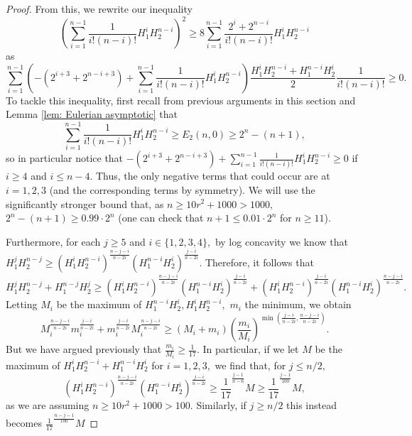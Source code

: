 \documentclass{article}
\theoremstyle{definition}
\theoremstyle{remark}
\begin{document}
\begin{proof}
\par From this, we rewrite our inequality \[\left(\sum\limits_{i=1}^{n-1} \frac{1}{i!(n-i)!}H_1^iH_2^{n-i}\right)^2 \geq 8 \sum\limits_{i=1}^{n-1} \frac{2^i + 2^{n-i}}{i!(n-i)!}H_1^iH_2^{n-i}\] as \[\sum\limits_{i=1}^{n-1} \left(- (2^{i+3} + 2^{n-i+3}) + \sum\limits_{i=1}^{n-1} \frac{1}{i!(n-i)!}H_1^iH_2^{n-i}\right) \frac{H_1^iH_2^{n-i} + H_1^{n-i}H_2^i}{2} \frac{1}{i!(n-i)!} \geq 0.\] To tackle this inequality, first recall from previous arguments in this section and Lemma \ref{lem: Eulerian asymptotic} that \[\sum\limits_{i=1}^{n-1} \frac{1}{i!(n-i)!}H_1^iH_2^{n-i} \geq E_2(n, 0) \geq 2^n - (n+1),\] so in particular notice that $- (2^{i+3} + 2^{n-i+3}) + \sum\limits_{i=1}^{n-1} \frac{1}{i!(n-i)!}H_1^iH_2^{n-i} \geq 0$ if $i \geq 4$ and $i \leq n-4.$ Thus, the only negative terms that could occur are at $i = 1, 2, 3$ (and the corresponding terms by symmetry). We will use the significantly stronger bound that, as $n \geq 10r^2 + 1000 > 1000,$ $2^n - (n+1) \geq 0.99 \cdot 2^n$ (one can check that $n+1 \leq 0.01 \cdot 2^n$ for $n \geq 11$).
\par Furthermore, for each $j \geq 5$ and $i \in \{1, 2, 3, 4\},$ by log concavity we know that $H_1^jH_2^{n-j} \geq (H_1^iH_2^{n-i})^{\frac{n - j - i}{n-2i}} (H_1^{n-i} H_2^i)^{\frac{j - i}{n-2i}}.$ Therefore, it follows that \[H_1^jH_2^{n-j} + H_1^{n-j}H_2^j \geq (H_1^iH_2^{n-i})^{\frac{n - j - i}{n-2i}} (H_1^{n-i} H_2^i)^{\frac{j - i}{n-2i}} + (H_1^iH_2^{n-i})^{\frac{j - i}{n-2i}} (H_1^{n-i} H_2^i)^{\frac{n - j - i}{n-2i}}.\] Letting $M_i$ be the maximum of $H_1^{n-i} H_2^i, H_1^i H_2^{n-i},$ $m_i$ the minimum, we obtain \[M_i^{\frac{n - j - i}{n-2i}} m_i^{\frac{j - i}{n-2i}} + m_i^{\frac{j - i}{n-2i}} M_i^{\frac{n - j - i}{n-2i}} \geq (M_i + m_i) \left(\frac{m_i}{M_i}\right)^{\min(\frac{j-i}{n-2i}, \frac{n-j-i}{n-2i})}.\] But we have argued previously that $\frac{m_i}{M_i} \geq \frac{1}{17}.$ In particular, if we let $M$ be the maximum of $H_1^iH_2^{n-i} + H_1^{n-i}H_2^i$ for $i = 1, 2, 3,$ we find that, for $j \leq n/2,$ \[(H_1^iH_2^{n-i})^{\frac{n - j - i}{n-2i}} (H_1^{n-i} H_2^i)^{\frac{j - i}{n-2i}} \geq \frac{1}{17}^{\frac{j-1}{n-6}}M \geq \frac{1}{17}^{\frac{j-1}{100}}M,\] as we are assuming $n \geq 10r^2 + 1000 > 100.$ Similarly, if $j \geq n/2$ this instead becomes $\frac{1}{17}^{\frac{n-j-1}{100}}M$

\end{proof}
\end{document}
